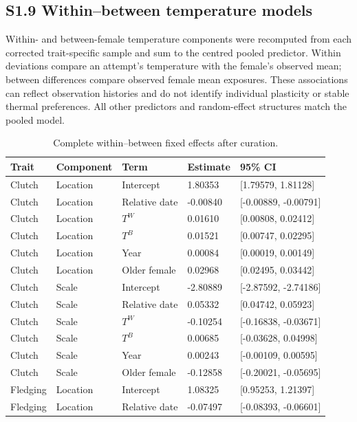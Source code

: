 \documentclass{article}
\begin{document}
\subsection{S1.9 Within--between temperature models}
\label{sec:within-between-supplement}

Within- and between-female temperature components were recomputed from each corrected trait-specific sample and sum to the centred pooled predictor. Within deviations compare an attempt's temperature with the female's observed mean; between differences compare observed female mean exposures. These associations can reflect observation histories and do not identify individual plasticity or stable thermal preferences. All other predictors and random-effect structures match the pooled model.

\begin{table}[!ht]\centering\scriptsize\singlespacing
\caption{Complete within--between fixed effects after curation.}\label{tab:within-between-fixed}
\begin{tabular}{lllll}\toprule
Trait & Component & Term & Estimate & 95\% CI\\\midrule
Clutch & Location & Intercept & 1.80353 & [1.79579, 1.81128]\\
Clutch & Location & Relative date & -0.00840 & [-0.00889, -0.00791]\\
Clutch & Location & $T^W$ & 0.01610 & [0.00808, 0.02412]\\
Clutch & Location & $T^B$ & 0.01521 & [0.00747, 0.02295]\\
Clutch & Location & Year & 0.00084 & [0.00019, 0.00149]\\
Clutch & Location & Older female & 0.02968 & [0.02495, 0.03442]\\
Clutch & Scale & Intercept & -2.80889 & [-2.87592, -2.74186]\\
Clutch & Scale & Relative date & 0.05332 & [0.04742, 0.05923]\\
Clutch & Scale & $T^W$ & -0.10254 & [-0.16838, -0.03671]\\
Clutch & Scale & $T^B$ & 0.00685 & [-0.03628, 0.04998]\\
Clutch & Scale & Year & 0.00243 & [-0.00109, 0.00595]\\
Clutch & Scale & Older female & -0.12858 & [-0.20021, -0.05695]\\
Fledging & Location & Intercept & 1.08325 & [0.95253, 1.21397]\\
Fledging & Location & Relative date & -0.07497 & [-0.08393, -0.06601]\\

\end{tabular}
\end{table}
\end{document}
